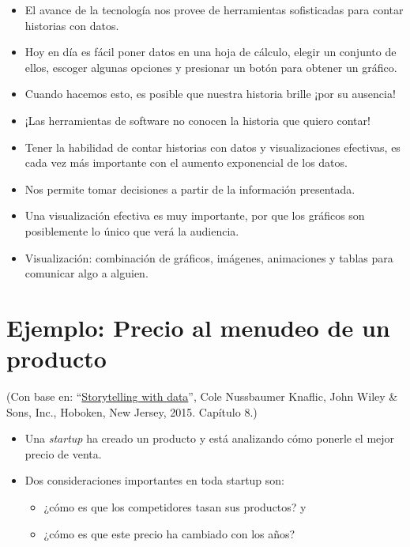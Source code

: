 \documentclass[
  letterpaper,
  DIV=11,
  numbers=noendperiod]{scrreprt}
\providecommand{\tightlist}{%
  \setlength{\itemsep}{0pt}\setlength{\parskip}{0pt}}\usepackage{longtable,booktabs,array}
\begin{document}
\begin{itemize}
\item
  El avance de la tecnología nos provee de herramientas sofisticadas
  para contar historias con datos.
\item
  Hoy en día es fácil poner datos en una hoja de cálculo, elegir un
  conjunto de ellos, escoger algunas opciones y presionar un botón para
  obtener un gráfico.
\item
  Cuando hacemos esto, es posible que nuestra historia brille ¡por su
  ausencia!
\item
  ¡Las herramientas de software no conocen la historia que quiero
  contar!
\item
  Tener la habilidad de contar historias con datos y visualizaciones
  efectivas, es cada vez más importante con el aumento exponencial de
  los datos.
\item
  Nos permite tomar decisiones a partir de la información presentada.
\item
  Una visualización efectiva es muy importante, por que los gráficos son
  posiblemente lo único que verá la audiencia.
\item
  Visualización: combinación de gráficos, imágenes, animaciones y tablas
  para comunicar algo a alguien.
\end{itemize}

\section{Ejemplo: Precio al menudeo de un
producto}\label{ejemplo-precio-al-menudeo-de-un-producto}

(Con base en:
``\href{https://www.storytellingwithdata.com/books}{Storytelling with
data}'', Cole Nussbaumer Knaflic, John Wiley \& Sons, Inc., Hoboken, New
Jersey, 2015. Capítulo 8.)

\begin{itemize}
\tightlist
\item
  Una \emph{startup} ha creado un producto y está analizando cómo
  ponerle el mejor precio de venta.
\item
  Dos consideraciones importantes en toda startup son:

  \begin{itemize}
  \tightlist
  \item
    ¿cómo es que los competidores tasan sus productos? y
  \item
    ¿cómo es que este precio ha cambiado con los años?
  \end{itemize}
\end{itemize}
\end{document}
